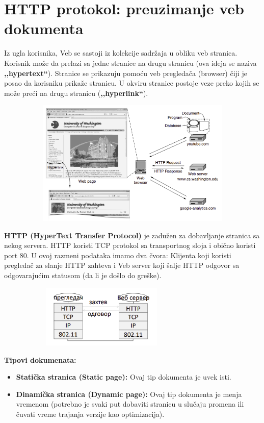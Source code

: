 \documentclass[a4paper]{article}
\begin{document}
\section{HTTP protokol: preuzimanje veb dokumenta}
    Iz ugla korisnika, Veb se sastoji iz kolekcije sadržaja u obliku veb stranica. Korisnik
    može da prelazi sa jedne stranice na drugu stranicu (ova ideja se naziva \textbf{,,hypertext``}).
    Stranice se prikazuju pomoću veb pregledača (browser) čiji je posao da korisniku prikaže stranicu.
    U okviru stranice postoje veze preko kojih se može preći na drugu stranicu (\textbf{,,hyperlink``}).
    \begin{figure}[H]
        \begin{center}
            \includegraphics[width=120mm,height=60mm]{Slike/http1.png}
        \end{center}
    \end{figure}

    \textbf{HTTP (HyperText Transfer Protocol)} je zadužen za dobavljanje stranica 
    sa nekog servera. HTTP koristi TCP protokol sa transportnog sloja i obično koristi port 80.
    U ovoj razmeni podataka imamo dva čvora: Klijenta koji koristi pregledač za slanje HTTP
    zahteva i Veb server koji šalje HTTP odgovor sa odgovarajućim statusom (da li je došlo do greške).
    \begin{figure}[H]
        \begin{center}
            \includegraphics[width=80mm,height=30mm]{Slike/http2.png}
        \end{center}
    \end{figure}
    \noindent \textbf{Tipovi dokumenata:}
    \begin{itemize}
        \item \textbf{Statička stranica (Static page):} Ovaj tip dokumenta je uvek isti.
        \item \textbf{Dinamička stranica (Dynamic page):} Ovaj tip dokumenta je menja vremenom 
              (potrebno je svaki put dobaviti stranicu u slučaju promena ili čuvati vreme
              trajanja verzije kao optimizacija).
    \end{itemize}
\end{document}
